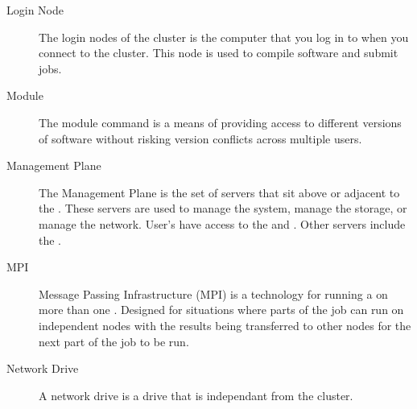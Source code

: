 \documentclass[letterpaper,10pt,english]{sphinxmanual}
\begin{document}
\begin{description}
\item[{Login Node\label{\detokenize{glossary:term-Login-Node}}}] \leavevmode
The login nodes of the cluster is the computer that you log in to when you connect to the cluster. This node is used to compile software and submit jobs.

\item[{Module\label{\detokenize{glossary:term-Module}}}] \leavevmode
The module command is a means of providing access to different versions of software without risking version conflicts across multiple users.

\item[{Management Plane\label{\detokenize{glossary:term-Management-Plane}}}] \leavevmode
The Management Plane is the set of servers that sit above or adjacent to the {\hyperref[\detokenize{glossary:term-Compute-Nodes}]{}}. These servers are used to manage the system, manage the storage, or manage the network. User’s have access to the {\hyperref[\detokenize{glossary:term-Login-Node}]{}} and {\hyperref[\detokenize{glossary:term-Data-Transfer-Node}]{}}. Other servers include the {\hyperref[\detokenize{glossary:term-Head-Node}]{}}.

\item[{MPI\label{\detokenize{glossary:term-MPI}}}] \leavevmode
Message Passing Infrastructure (MPI) is a technology for running a {\hyperref[\detokenize{glossary:term-Batch-Job}]{}} on more than one {\hyperref[\detokenize{glossary:term-Compute-Nodes}]{}}. Designed for situations where parts of the job can run on independent nodes with the results being transferred to other nodes for the next part of the job to be run.

\item[{Network Drive\label{\detokenize{glossary:term-Network-Drive}}}] \leavevmode
A network drive is a drive that is independant from the cluster.


\end{description}
\end{document}
